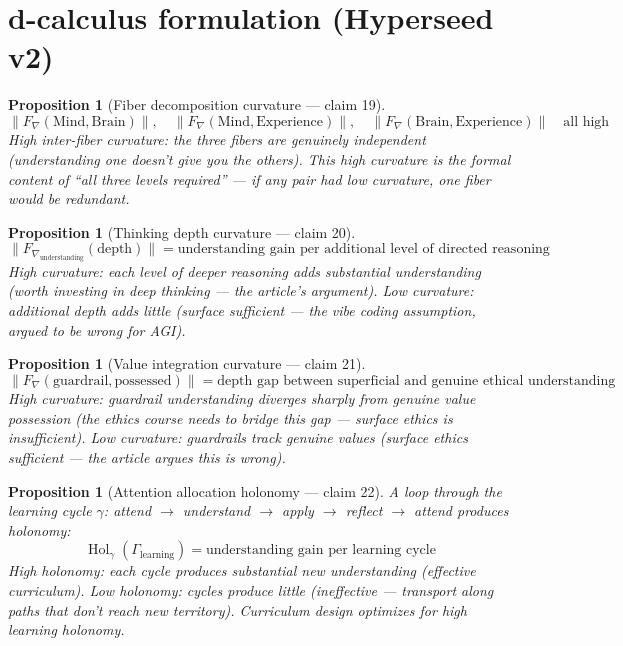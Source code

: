 \documentclass[11pt,a4paper]{article}
\newtheorem{proposition}[definition]{Proposition}
\begin{document}
\section{d-calculus formulation (Hyperseed v2)}

\begin{proposition}[Fiber decomposition curvature --- claim 19]
\label{prop:fib_curv}
\[
  \|F_\nabla(\text{Mind}, \text{Brain})\|, \quad
  \|F_\nabla(\text{Mind}, \text{Experience})\|, \quad
  \|F_\nabla(\text{Brain}, \text{Experience})\|
  \quad \text{all high}
\]
High inter-fiber curvature: the three fibers are genuinely independent
(understanding one doesn't give you the others). This high curvature is
the formal content of ``all three levels required'' --- if any pair had
low curvature, one fiber would be redundant.
\end{proposition}

\begin{proposition}[Thinking depth curvature --- claim 20]
\label{prop:depth_curv}
\[
  \|F_{\nabla_{\text{understanding}}}(\text{depth})\| =
    \text{understanding gain per additional level of directed reasoning}
\]
High curvature: each level of deeper reasoning adds substantial
understanding (worth investing in deep thinking --- the article's
argument). Low curvature: additional depth adds little (surface
sufficient --- the vibe coding assumption, argued to be wrong for AGI).
\end{proposition}

\begin{proposition}[Value integration curvature --- claim 21]
\label{prop:val_curv}
\[
  \|F_\nabla(\text{guardrail}, \text{possessed})\| = \text{depth gap
    between superficial and genuine ethical understanding}
\]
High curvature: guardrail understanding diverges sharply from genuine
value possession (the ethics course needs to bridge this gap --- surface
ethics is insufficient). Low curvature: guardrails track genuine values
(surface ethics sufficient --- the article argues this is wrong).
\end{proposition}

\begin{proposition}[Attention allocation holonomy --- claim 22]
\label{prop:attn_hol}
A loop through the learning cycle $\gamma$: attend $\to$ understand
$\to$ apply $\to$ reflect $\to$ attend produces holonomy:
\[
  \operatorname{Hol}_\gamma(\Gamma_{\text{learning}}) =
    \text{understanding gain per learning cycle}
\]
High holonomy: each cycle produces substantial new understanding
(effective curriculum). Low holonomy: cycles produce little (ineffective
--- transport along paths that don't reach new territory). Curriculum
design optimizes for high learning holonomy.
\end{proposition}
\end{document}
